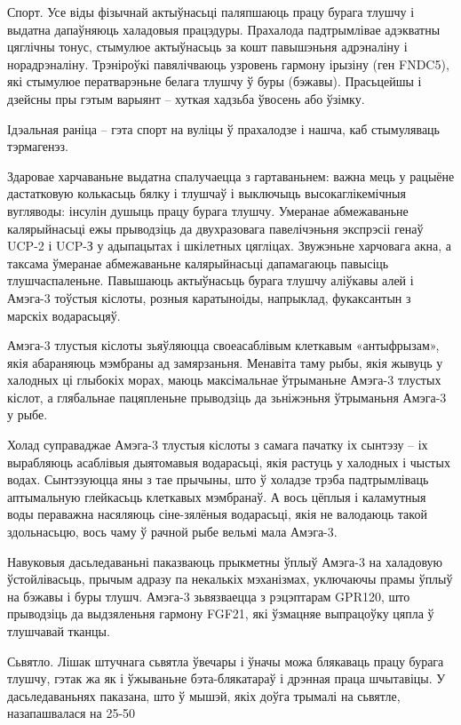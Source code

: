 Спорт. Усе віды фізычнай актыўнасьці паляпшаюць працу бурага тлушчу і выдатна дапаўняюць халадовыя працэдуры. Прахалода падтрымлівае адэкватны цяглічны тонус, стымулюе актыўнасьць за кошт павышэньня адрэналіну і норадрэналіну. Трэніроўкі павялічваюць узровень гармону ірызіну (ген FNDC5), які стымулюе ператварэньне белага тлушчу ў буры (бэжавы). Прасьцейшы і дзейсны пры гэтым варыянт – хуткая хадзьба ўвосень або ўзімку.

Ідэальная раніца – гэта спорт на вуліцы ў прахалодзе і нашча, каб стымуляваць тэрмагенэз.

Здаровае харчаваньне выдатна спалучаецца з гартаваньнем: важна мець у рацыёне дастатковую колькасьць бялку і тлушчаў і выключыць высокаглікемічныя вугляводы: інсулін душыць працу бурага тлушчу. Умеранае абмежаваньне калярыйнасьці ежы прыводзіць да двухразовага павелічэньня экспрэсіі генаў UCP-2 і UCP-З у адыпацытах і шкілетных цягліцах. Звужэньне харчовага акна, а таксама ўмеранае абмежаваньне калярыйнасьці дапамагаюць павысіць тлушчаспаленьне. Павышаюць актыўнасьць бурага тлушчу аліўкавы алей і Амэга-3 тоўстыя кіслоты, розныя каратыноіды, напрыклад, фукаксантын з марскіх водарасьцяў.

Амэга-3 тлустыя кіслоты зьяўляюцца своеасаблівым клеткавым «антыфрызам», якія абараняюць мэмбраны ад замярзаньня. Менавіта таму рыбы, якія жывуць у халодных ці глыбокіх морах, маюць максімальнае ўтрыманьне Амэга-3 тлустых кіслот, а глябальнае пацяпленьне прыводзіць да зьніжэньня ўтрыманьня Амэга-3 у рыбе.

Холад суправаджае Амэга-3 тлустыя кіслоты з самага пачатку іх сынтэзу – іх вырабляюць асаблівыя дыятомавыя водарасьці, якія растуць у халодных і чыстых водах. Сынтэзуюцца яны з тае прычыны, што ў холадзе трэба падтрымліваць аптымальную глейкасьць клеткавых мэмбранаў. А вось цёплыя і каламутныя воды пераважна насяляюць сіне-зялёныя водарасьці, якія не валодаюць такой здольнасьцю, вось чаму ў рачной рыбе вельмі мала Амэга-3.

Навуковыя дасьледаваньні паказваюць прыкметны ўплыў Амэга-3 на халадовую ўстойлівасьць, прычым адразу па некалькіх мэханізмах, уключаючы прамы ўплыў на бэжавы і буры тлушч. Амэга-3 зьвязваецца з рэцэптарам GPR120, што прыводзіць да выдзяленьня гармону FGF21, які ўзмацняе выпрацоўку цяпла ў тлушчавай тканцы.

Сьвятло. Лішак штучнага сьвятла ўвечары і ўначы можа блякаваць працу бурага тлушчу, гэтак жа як і ўжываньне бэта-блякатараў і дрэнная праца шчытавіцы. У дасьледаваньнях паказана, што ў мышэй, якіх доўга трымалі на сьвятле, назапашвалася на 25-50%


